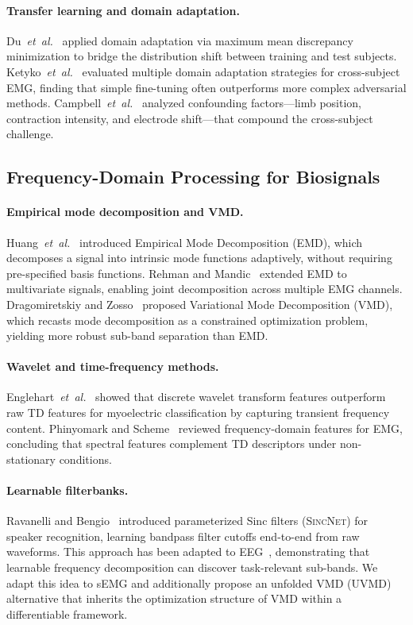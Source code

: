 \documentclass[conference]{IEEEtran}
\newcommand{\etal}{\mbox{\textit{et~al.}}}
\newcommand{\uvmd}{\textsc{UVMD}}
\begin{document}
\paragraph{Transfer learning and domain adaptation.}
Du~\etal~\cite{du2017surface} applied domain adaptation via maximum mean discrepancy minimization to bridge the distribution shift between training and test subjects.
Ketyko~\etal~\cite{ketyko2019domain} evaluated multiple domain adaptation strategies for cross-subject EMG, finding that simple fine-tuning often outperforms more complex adversarial methods.
Campbell~\etal~\cite{campbell2020current} analyzed confounding factors---limb position, contraction intensity, and electrode shift---that compound the cross-subject challenge.

\subsection{Frequency-Domain Processing for Biosignals}

\paragraph{Empirical mode decomposition and VMD.}
Huang~\etal~\cite{huang1998empirical} introduced Empirical Mode Decomposition (EMD), which decomposes a signal into intrinsic mode functions adaptively, without requiring pre-specified basis functions.
Rehman and Mandic~\cite{rehman2010multivariate} extended EMD to multivariate signals, enabling joint decomposition across multiple EMG channels.
Dragomiretskiy and Zosso~\cite{dragomiretskiy2014variational} proposed Variational Mode Decomposition (VMD), which recasts mode decomposition as a constrained optimization problem, yielding more robust sub-band separation than EMD.

\paragraph{Wavelet and time-frequency methods.}
Englehart~\etal~\cite{englehart1999wavelet} showed that discrete wavelet transform features outperform raw TD features for myoelectric classification by capturing transient frequency content.
Phinyomark and Scheme~\cite{phinyomark2018emg_frequency} reviewed frequency-domain features for EMG, concluding that spectral features complement TD descriptors under non-stationary conditions.

\paragraph{Learnable filterbanks.}
Ravanelli and Bengio~\cite{ravanelli2018speaker} introduced parameterized Sinc filters (\textsc{SincNet}) for speaker recognition, learning bandpass filter cutoffs end-to-end from raw waveforms.
This approach has been adapted to EEG~\cite{borra2020sincnet_eeg}, demonstrating that learnable frequency decomposition can discover task-relevant sub-bands.
We adapt this idea to sEMG and additionally propose an unfolded VMD (\uvmd{}) alternative that inherits the optimization structure of VMD within a differentiable framework.
\end{document}
